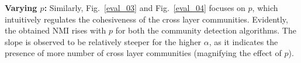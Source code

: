\textbf{Varying $p$:}
Similarly, Fig.~\ref{eval_03} and Fig.~\ref{eval_04} focuses on $p$, which intuitively regulates the cohesiveness of
the cross layer communities. Evidently, the obtained NMI rises with $p$ for both the community detection algorithms. The slope is
observed to be relatively steeper for the higher $\alpha$, as it indicates the presence of
more number of cross layer communities (magnifying the effect of $p$).

